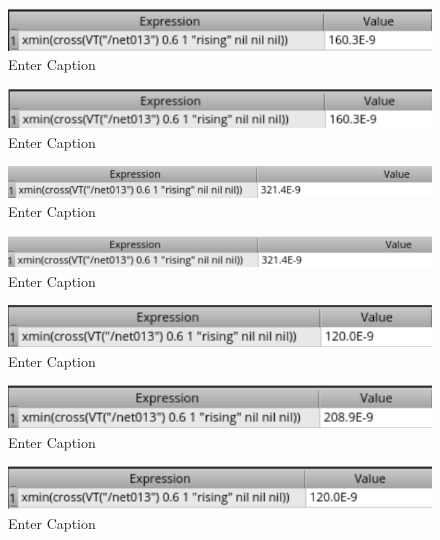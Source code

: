 \documentclass[12pt]{article}
\begin{document}
\begin{figure}[H]
    \centering
    \includegraphics[width=0.5\linewidth]{writeup//figures/optimized_wbuf_value2.png}
    \caption{Enter Caption}
\end{figure}

\begin{figure}[H]
    \centering
    \includegraphics[width=0.5\linewidth]{writeup//figures/wbuf2.png}
    \caption{Enter Caption}
\end{figure}

\begin{figure}[H]
    \centering
    \includegraphics[width=0.5\linewidth]{writeup//figures/optimized_wmux_value_3.png}
    \caption{Enter Caption}
\end{figure}

\begin{figure}[H]
    \centering
    \includegraphics[width=0.5\linewidth]{writeup//figures/wmux3.png}
    \caption{Enter Caption}
\end{figure}

\begin{figure}[H]
    \centering
    \includegraphics[width=0.5\linewidth]{writeup//figures/wbuf3.png}
    \caption{Enter Caption}
\end{figure}


\begin{figure}[H]
    \centering
    \includegraphics[width=0.5\linewidth]{writeup//figures/wmux4.png}
    \caption{Enter Caption}
\end{figure}

\begin{figure}
    \centering
    \includegraphics[width=0.5\linewidth]{writeup//figures/wbuf4.png}
    \caption{Enter Caption}
\end{figure}
\end{document}
